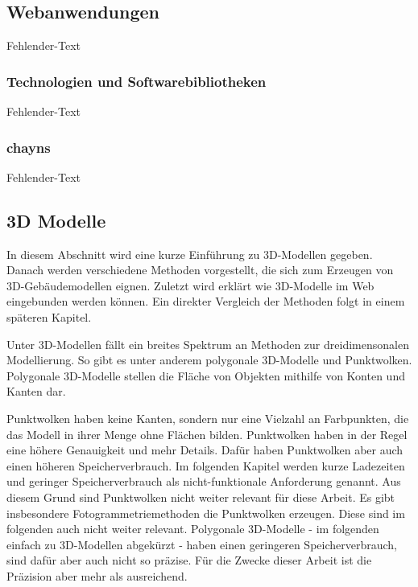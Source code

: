 \subsection{Webanwendungen}
Fehlender-Text

\subsubsection{Technologien und Softwarebibliotheken}\label{sec:WebTechnologies}
Fehlender-Text

\subsubsection{chayns}\label{sec:Chayns}
Fehlender-Text

\subsection{3D Modelle}
In diesem Abschnitt wird eine kurze Einführung zu 3D-Modellen gegeben. Danach werden verschiedene Methoden vorgestellt, die sich zum Erzeugen von 3D-Gebäudemodellen eignen. Zuletzt wird erklärt wie 3D-Modelle im Web eingebunden werden können. Ein direkter Vergleich der Methoden folgt in einem späteren Kapitel.

Unter 3D-Modellen fällt ein breites Spektrum an Methoden zur dreidimensonalen Modellierung. So gibt es unter anderem polygonale 3D-Modelle und Punktwolken. Polygonale 3D-Modelle stellen die Fläche von Objekten mithilfe von Konten und Kanten dar. 

Punktwolken haben keine Kanten, sondern nur eine Vielzahl an Farbpunkten, die das Modell in ihrer Menge ohne Flächen bilden. Punktwolken haben in der Regel eine höhere Genauigkeit und mehr Details. Dafür haben Punktwolken aber auch einen höheren Speicherverbrauch. Im folgenden Kapitel werden kurze Ladezeiten und geringer Speicherverbrauch als nicht-funktionale Anforderung genannt. Aus diesem Grund sind Punktwolken nicht weiter relevant für diese Arbeit. Es gibt insbesondere Fotogrammetriemethoden die Punktwolken erzeugen. Diese sind im folgenden auch nicht weiter relevant. Polygonale 3D-Modelle - im folgenden einfach zu 3D-Modellen abgekürzt - haben einen geringeren Speicherverbrauch, sind dafür aber auch nicht so präzise. Für die Zwecke dieser Arbeit ist die Präzision aber mehr als ausreichend.

